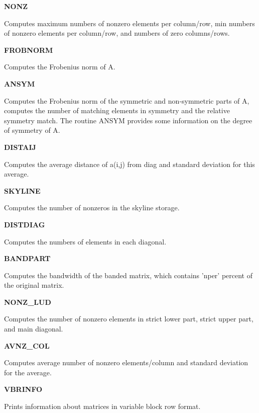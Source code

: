 \documentclass[12pt]{article}
\def\marg#1{\parbox[b]{1.3in}{\bf #1}}
\def\disp#1{\parbox[t]{4.62in}{#1} \vskip 0.2in }
\begin{document}
\marg{ NONZ }\disp{ Computes maximum numbers of nonzero elements
per column/row, min numbers of nonzero elements per column/row,
and numbers of zero columns/rows.}

\marg{ FROBNORM }\disp{ Computes the Frobenius norm of A.}

\marg{ ANSYM }\disp{ Computes the Frobenius norm of the symmetric and
non-symmetric parts of A, computes the number of matching elements in symmetry 
and the relative symmetry match.
The routine ANSYM provides some information on the degree of symmetry of A.}

\marg{ DISTAIJ }\disp{ Computes the average distance of a(i,j) from diag and
standard deviation  for this average.}

\marg{ SKYLINE }\disp{ Computes the number of nonzeros in the skyline storage.}

\marg{ DISTDIAG }\disp{ Computes the numbers of elements in each diagonal.}

\marg{ BANDPART }\disp{ Computes the bandwidth of the banded matrix,
which contains 'nper' percent of the original matrix.}


\marg{ NONZ\_LUD }\disp{ Computes the number of nonzero elements in strict
lower part, strict upper part, and main diagonal.}

\marg{ AVNZ\_COL }\disp{ Computes average number of nonzero elements/column
and standard deviation for the average.}

\marg{ VBRINFO }\disp{ Prints information about matrices in variable block row 
format.}
\end{document}
